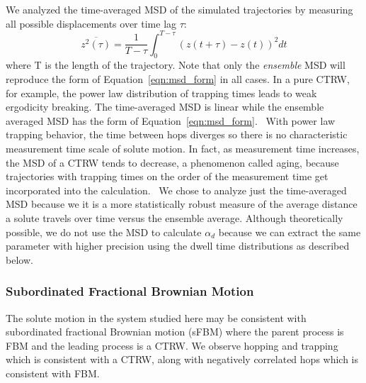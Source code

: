 \documentclass{article}
\begin{document}
  We analyzed the time-averaged MSD of the simulated trajectories by measuring
  all possible displacements over time lag $\tau$:
  \begin{equation}
  \overline{z^2(\tau)} = \dfrac{1}{T - \tau}\int_{0}^{T - \tau} (z(t + \tau) - z(t))^2 dt
  \end{equation}
  where T is the length of the trajectory. Note that only the \textit{ensemble} MSD
  will reproduce the form of Equation~\ref{eqn:msd_form} in all cases. 
  In a pure CTRW, for example, the power law distribution of trapping times leads to
  weak ergodicity breaking. The time-averaged MSD is linear while the ensemble averaged
  MSD has the form of Equation~\ref{eqn:msd_form}.~\cite{meroz_toolbox_2015} With power
  law trapping behavior, the time between hops diverges so there is no characteristic
  measurement time scale of solute motion. In fact, as measurement time increases, the 
  MSD of a CTRW tends to decrease, a phenomenon called aging, because trajectories 
  with trapping times on the order of the measurement time get incorporated into the 
  calculation.~\cite{bel_weak_2005} We chose to analyze just the time-averaged MSD 
  because we it is a more statistically robust measure of the average distance a solute
  travels over time versus the ensemble average. Although theoretically possible, we do
  not use the MSD to calculate $\alpha_d$ because we can extract the same parameter 
  with higher precision using the dwell time distributions as described below.
  
  
  \subsubsection*{Subordinated Fractional Brownian Motion}
  
  The solute motion in the system studied here may be consistent with 
  subordinated fractional Brownian motion (sFBM) where the parent process is FBM and 
  the leading process is a CTRW. We observe hopping and trapping which is consistent
  with a CTRW, along with negatively correlated hops which is consistent with FBM.  
\end{document}
